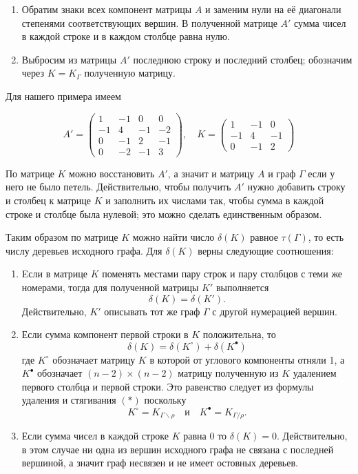 \documentclass{article}
\begin{document}
\begin{enumerate}
\item Обратим знаки всех компонент матрицы $A$ и заменим нули на её диагонали степенями соответствующих вершин. 
В полученной матрице $A'$ сумма чисел в каждой строке и в каждом столбце равна нулю. 
\item Выбросим из матрицы $A'$ последнюю строку и последний столбец;
обозначим через $K=K_\Gamma$ полученную матрицу.
\end{enumerate}

Для нашего примера имеем

\[A'=\left(
\begin{matrix}
1&-1&0&0
\\
-1&4&-1&-2
\\
0&-1&2&-1
\\
0&-2&-1&3
\end{matrix}
\right),
\quad 
K=\left(
\begin{matrix}
1&-1&0
\\
-1&4&-1
\\
0&-1&2
\end{matrix}
\right)\]

По матрице $K$ можно восстановить $A'$, а значит и матрицу $A$ и граф $\Gamma$ если у него не было петель.
Действительно, чтобы получить $A'$ нужно добавить строку и столбец к матрице $K$ и заполнить их числами так, чтобы сумма в каждой строке и столбце была нулевой;
это можно сделать единственным образом.

Таким образом по матрице $K$ можно найти число $\delta(K)$ равное $\tau(\Gamma)$, то есть числу деревьев исходного графа.
Для $\delta(K)$ верны следующие соотношения:
\begin{enumerate}
\item Eсли в матрице $K$ поменять местами пару строк и пару столбцов с теми же номерами,
тогда для полученной матрицы $K'$ выполняется 
\[\delta(K)=\delta(K').\]
Действительно, $K'$ описывать тот же граф $\Gamma$ с другой нумерацией вершин.
\item 
Если сумма компонент первой строки в $K$ положительна, то
\[\delta(K)=\delta(K^{\circ})+\delta(K^{\bullet})\]
где $K^{\circ}$ обозначает матрицу $K$ в которой от углового компоненты отняли 1, а $K^{\bullet}$ обозначает $(n-2)\times(n-2)$ матрицу полученную из $K$ удалением первого столбца и первой строки.
Это равенство следует из формулы удаления и стягивания $({*})$ поскольку \[K^{\circ}=K_{\Gamma\backslash\rho}\quad\text{и}\quad K^{\bullet}=K_{\Gamma/\rho}.\]
\item Если сумма чисел в каждой строке $K$ равна $0$ то $\delta(K)=0$. 
Действительно, в этом случае ни одна из вершин исходного графа не связана с последней вершиной, а значит граф несвязен и не имеет остовных деревьев.
\end{enumerate}
\end{document}
